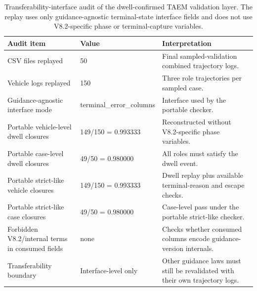 \begin{table}[pos=htbp]
\centering
\scriptsize
\caption{Transferability-interface audit of the dwell-confirmed TAEM validation layer. The replay uses only guidance-agnostic terminal-state interface fields and does not use V8.2-specific phase or terminal-capture variables.}
\label{tab:transferability_interface_audit}
\begin{tabular}{lll}
\hline
Audit item & Value & Interpretation \\
\hline
CSV files replayed & 50 & Final sampled-validation combined trajectory logs. \\
Vehicle logs replayed & 150 & Three role trajectories per sampled case. \\
Guidance-agnostic interface mode & terminal_error_columns & Interface used by the portable checker. \\
Portable vehicle-level dwell closures & 149/150 = 0.993333 & Reconstructed without V8.2-specific phase variables. \\
Portable case-level dwell closures & 49/50 = 0.980000 & All roles must satisfy the dwell event. \\
Portable strict-like vehicle closures & 149/150 = 0.993333 & Dwell replay plus available terminal-reason and escape checks. \\
Portable strict-like case closures & 49/50 = 0.980000 & Case-level pass under the portable strict-like checker. \\
Forbidden V8.2/internal terms in consumed fields & none & Checks whether consumed columns encode guidance-version internals. \\
Transferability boundary & Interface-level only & Other guidance laws must still be revalidated with their own trajectory logs. \
\hline
\end{tabular}
\end{table}
